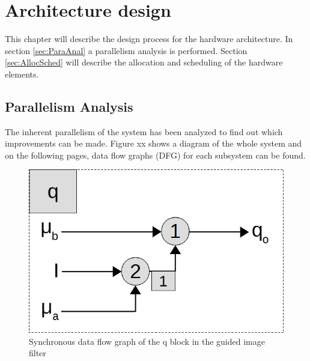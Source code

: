 \chapter{Architecture design} \label{ch:archdesign}
This chapter will describe the design process for the hardware architecture. In section \ref{sec:ParaAnal} a parallelism analysis is performed. Section \ref{sec:AllocSched} will describe the allocation and scheduling of the hardware elements.

\section{Parallelism Analysis}
The inherent parallelism of the system has been analyzed to find out which improvements can be made. Figure xx shows a diagram of the whole system and on the following pages, data flow graphs (DFG) for each subsystem can be found. \\

\begin{figure}[ht!]
  \centering
  \includegraphics[scale=0.3]{figures/SDFG_q}
  \caption{Synchronous data flow graph of the q block in the guided image filter}
  \label{fig:sdfg_q}
\end{figure}


